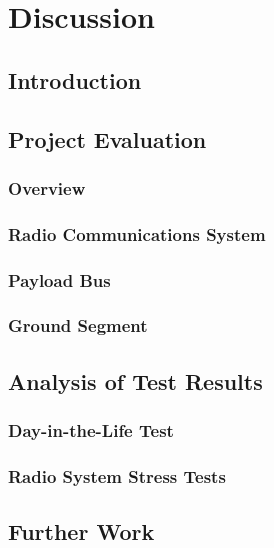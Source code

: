 \chapter{Discussion}
\label{ch:discussion}

\section{Introduction}

\section{Project Evaluation}

\subsection{Overview}

\subsection{Radio Communications System}

\subsection{Payload Bus}

\subsection{Ground Segment}

\section{Analysis of Test Results}

\subsection{Day-in-the-Life Test}

\subsection{Radio System Stress Tests}

\section{Further Work} %